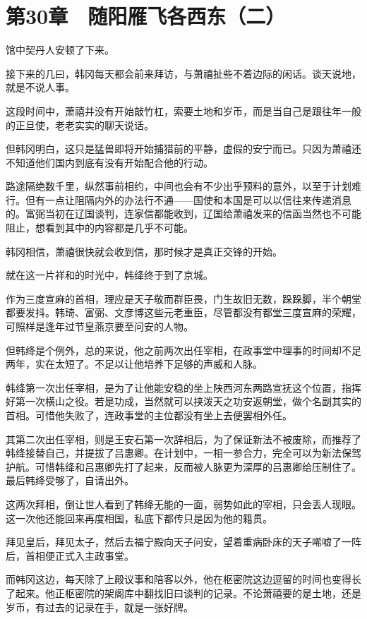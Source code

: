 \section{第30章　随阳雁飞各西东（二）}

馆中契丹人安顿了下来。

接下来的几曰，韩冈每天都会前来拜访，与萧禧扯些不着边际的闲话。谈天说地，就是不说人事。

这段时间中，萧禧并没有开始敲竹杠，索要土地和岁币，而是当自己是跟往年一般的正旦使，老老实实的聊天说话。

但韩冈明白，这只是猛兽即将开始捕猎前的平静，虚假的安宁而已。只因为萧禧还不知道他们国内到底有没有开始配合他的行动。

路途隔绝数千里，纵然事前相约，中间也会有不少出乎预料的意外，以至于计划难行。但有一点让阻隔内外的办法行不通——国使和本国是可以以信往来传递消息的。富弼当初在辽国谈判，连家信都能收到，辽国给萧禧发来的信函当然也不可能阻止，想看到其中的内容都是几乎不可能。

韩冈相信，萧禧很快就会收到信，那时候才是真正交锋的开始。

就在这一片祥和的时光中，韩绛终于到了京城。

作为三度宣麻的首相，理应是天子敬而群臣畏，门生故旧无数，跺跺脚，半个朝堂都要发抖。韩琦、富弼、文彦博这些元老重臣，尽管都没有都堂三度宣麻的荣耀，可照样是逢年过节皇燕京要至问安的人物。

但韩绛是个例外，总的来说，他之前两次出任宰相，在政事堂中理事的时间却不足两年，实在太短了。不足以让他培养下足够的声威和人脉。

韩绛第一次出任宰相，是为了让他能安稳的坐上陕西河东两路宣抚这个位置，指挥好第一次横山之役。若是功成，当然就可以挟泼天之功安返朝堂，做个名副其实的首相。可惜他失败了，连政事堂的主位都没有坐上去便罢相外任。

其第二次出任宰相，则是王安石第一次辞相后，为了保证新法不被废除，而推荐了韩绛接替自己，并提拔了吕惠卿。在计划中，一相一参合力，完全可以为新法保驾护航。可惜韩绛和吕惠卿先打了起来，反而被人脉更为深厚的吕惠卿给压制住了。最后韩绛受够了，自请出外。

这两次拜相，倒让世人看到了韩绛无能的一面，弱势如此的宰相，只会丢人现眼。这一次他还能回来再度相国，私底下都传只是因为他的籍贯。

拜见皇后，拜见太子，然后去福宁殿向天子问安，望着重病卧床的天子唏嘘了一阵后，首相便正式入主政事堂。

而韩冈这边，每天除了上殿议事和陪客以外，他在枢密院这边逗留的时间也变得长了起来。他正枢密院的架阁库中翻找旧曰谈判的记录。不论萧禧要的是土地，还是岁币，有过去的记录在手，就是一张好牌。


